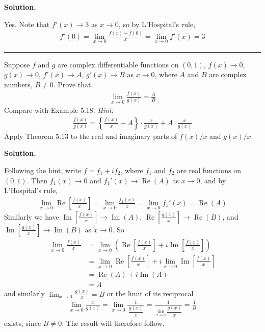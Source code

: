 \documentclass[12pt]{article}
\theoremstyle{definition}
\begin{document}
\smallskip
\noindent\textbf{Solution.}\quad

Yes. Note that $f'(x)\to 3$ as $x\to 0$, so by L'Hospital's rule,
\begin{align*}
f'(0)
=\lim_{x\to 0}\frac{f(x)-f(0)}{x}
=\lim_{x\to 0}f'(x)
=3
\end{align*}



\bigskip\noindent\hrule\bigskip

Suppose $f$ and $g$ are complex differentiable functions on $(0,1)$, $f(x)\to 0$, $g(x)\to 0$, $f'(x)\to A$, $g'(x)\to B$ as $x\to 0$, where $A$ and $B$ are complex numbers, $B\ne 0$. Prove that
\begin{align*}
\lim_{x\to 0}\frac{f(x)}{g(x)}=\frac{A}{B}
\end{align*}
Compare with Example 5.18. \textit{Hint:}
\begin{align*}
\frac{f(x)}{g(x)}=\left\{\frac{f(x)}{x}-A\right\}\cdot\frac{x}{g(x)}+A\cdot\frac{x}{g(x)}
\end{align*}
Apply Theorem 5.13 to the real and imaginary parts of $f(x)/x$ and $g(x)/x$.

\smallskip
\noindent\textbf{Solution.}\quad

Following the hint, write $f=f_1+if_2$, where $f_1$ and $f_2$ are real functions on $(0,1)$. Then $f_1(x)\to 0$ and $f_1'(x)\to\operatorname{Re}(A)$ as $x\to 0$, and by L'Hospital's rule,
\begin{align*}
\lim_{x\to 0}\operatorname{Re}\left[\frac{f(x)}{x}\right]
=\lim_{x\to 0}\frac{f_1(x)}{x}
=\lim_{x\to 0}f_1'(x)
=\operatorname{Re}(A)
\end{align*}
Similarly we have $\operatorname{Im}\left[\frac{f(x)}{x}\right]\to\operatorname{Im}(A)$, $\operatorname{Re}\left[\frac{g(x)}{x}\right]\to\operatorname{Re}(B)$, and $\operatorname{Im}\left[\frac{g(x)}{x}\right]\to\operatorname{Im}(B)$ as $x\to 0$. So
\begin{align*}
\lim_{x\to 0}\frac{f(x)}{x}
&=\lim_{x\to 0}\left(\operatorname{Re}\left[\frac{f(x)}{x}\right]+i\operatorname{Im}\left[\frac{f(x)}{x}\right]\right) \\
&=\lim_{x\to 0}\operatorname{Re}\left[\frac{f(x)}{x}\right]+i\lim_{x\to 0}\operatorname{Im}\left[\frac{f(x)}{x}\right] \\
&=\operatorname{Re}(A)+i\operatorname{Im}(A) \\
&=A
\end{align*}
and similarly $\lim_{x\to 0}\frac{g(x)}{x}=B$ or the limit of its reciprocal
\begin{align*}
\lim_{x\to 0}\frac{x}{g(x)}
=\lim_{x\to 0}\frac{1}{\,\dfrac{g(x)}{x}\,}
=\frac{1}{\displaystyle\lim_{x\to 0}\dfrac{g(x)}{x}}
=\frac{1}{B}
\end{align*}
exists, since $B\ne 0$. The result will therefore follow.
\end{document}
